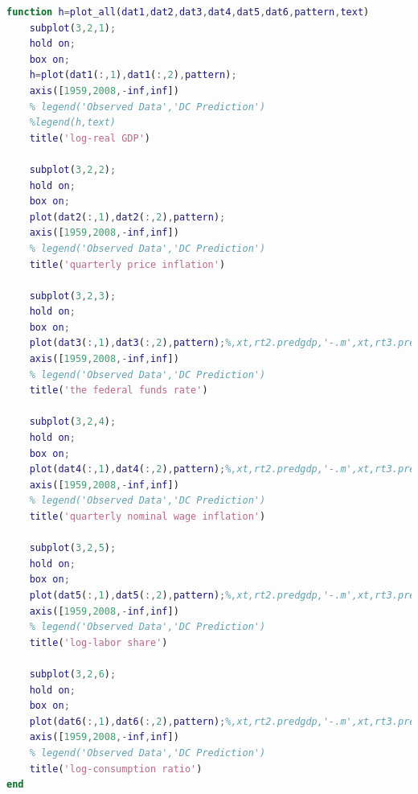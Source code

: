 \documentclass[11pt, oneside]{article}   	%
\begin{document}
\begin{lstlisting}[language=Matlab ,caption={Matlab code for plot data.}, label={code:plot}]
function h=plot_all(dat1,dat2,dat3,dat4,dat5,dat6,pattern,text)
    subplot(3,2,1);
    hold on;
    box on;
    h=plot(dat1(:,1),dat1(:,2),pattern);
    axis([1959,2008,-inf,inf])
    % legend('Observed Data','DC Prediction')
    %legend(h,text)
    title('log-real GDP')

    subplot(3,2,2);
    hold on;
    box on;
    plot(dat2(:,1),dat2(:,2),pattern);
    axis([1959,2008,-inf,inf])
    % legend('Observed Data','DC Prediction')
    title('quarterly price inflation')
    
    subplot(3,2,3);
    hold on;
    box on;
    plot(dat3(:,1),dat3(:,2),pattern);%,xt,rt2.predgdp,'-.m',xt,rt3.predgdp,'--c',xt,rt4.predgdp,':r')
    axis([1959,2008,-inf,inf])
    % legend('Observed Data','DC Prediction')
    title('the federal funds rate')
    
    subplot(3,2,4);
    hold on;
    box on;
    plot(dat4(:,1),dat4(:,2),pattern);%,xt,rt2.predgdp,'-.m',xt,rt3.predgdp,'--c',xt,rt4.predgdp,':r')
    axis([1959,2008,-inf,inf])
    % legend('Observed Data','DC Prediction')
    title('quarterly nominal wage inflation')
    
    subplot(3,2,5);
    hold on;
    box on;
    plot(dat5(:,1),dat5(:,2),pattern);%,xt,rt2.predgdp,'-.m',xt,rt3.predgdp,'--c',xt,rt4.predgdp,':r')
    axis([1959,2008,-inf,inf])
    % legend('Observed Data','DC Prediction')
    title('log-labor share')
    
    subplot(3,2,6);
    hold on;
    box on;
    plot(dat6(:,1),dat6(:,2),pattern);%,xt,rt2.predgdp,'-.m',xt,rt3.predgdp,'--c',xt,rt4.predgdp,':r')
    axis([1959,2008,-inf,inf])
    % legend('Observed Data','DC Prediction')
    title('log-consumption ratio')
end
\end{lstlisting}



\end{document}
